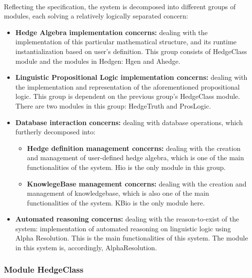 \documentclass[../gr-final.tex]{subfiles}
\begin{document}
\paragraph{} Reflecting the specification, the system is decomposed
into different groups of modules, each solving a relatively logically separated
concern:
\begin{itemize}
\item {\bfseries Hedge Algebra implementation concerns:} dealing with
  the implementation of this particular mathematical structure, and
  its runtime instantialization based on user's definition. This
  group consists of HedgeClass module and the modules in Hedgen:
  Hgen and Ahedge.
\item {\bfseries Linguistic Propositional Logic implementation concerns:} dealing
  with the implementation and representation of the aforementioned
  propositional logic. This group is dependent on the previous group's
  HedgeClass module. There are two modules in this group: HedgeTruth
  and ProsLogic.
\item {\bfseries Database interaction concerns:} dealing with
        database operations, which furtherly decomposed into:
        \begin{itemize}
          \item {\bfseries Hedge definition management concerns:}
                  dealing with the creation and management of
                  user-defined hedge algebra, which is one of the
                  main functionalities of the system. Hio is the
                  only module in this group. 
          \item {\bfseries KnowlegeBase management concerns:}
                  dealing with the creation and management of
                  knowledgebase, which is also one of the main
                  functionalities of the system. KBio is the only
                  module here.
        \end{itemize}
\item {\bfseries Automated reasoning concerns:} dealing with the
  reason-to-exist of the system: implementation of automated reasoning
  on linguistic logic using Alpha Resolution. This is the main
  functionalities of this system. The module in this system is,
  accordingly, AlphaResolution.
\end{itemize}
\subsubsection{Module HedgeClass}
\end{document}
